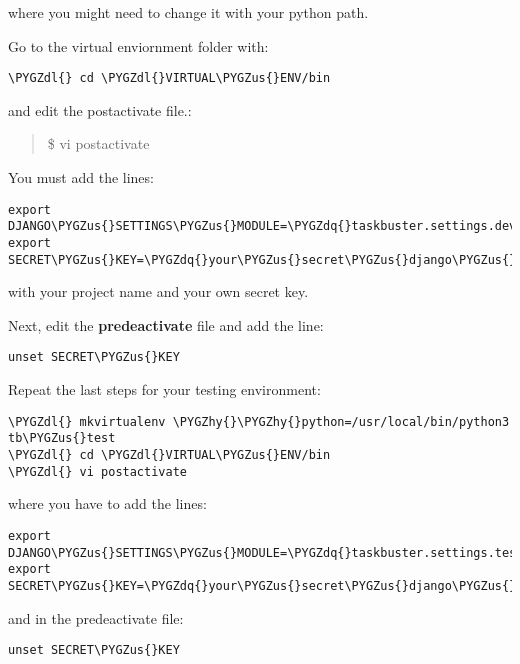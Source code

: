 \documentclass[letterpaper,10pt,english]{sphinxmanual}
\def\PYGZus{\char`\_}
\def\PYGZdl{\char`\$}
\def\PYGZhy{\char`\-}
\def\PYGZdq{\char`\"}
\begin{document}
where you might need to change it with your python path.

Go to the virtual enviornment folder with:

\begin{Verbatim}[commandchars=\\\{\}]
\PYGZdl{} cd \PYGZdl{}VIRTUAL\PYGZus{}ENV/bin
\end{Verbatim}

and edit the postactivate file.:
\begin{quote}

\$ vi postactivate
\end{quote}

You must add the lines:

\begin{Verbatim}[commandchars=\\\{\}]
export DJANGO\PYGZus{}SETTINGS\PYGZus{}MODULE=\PYGZdq{}taskbuster.settings.development\PYGZdq{}
export SECRET\PYGZus{}KEY=\PYGZdq{}your\PYGZus{}secret\PYGZus{}django\PYGZus{}key\PYGZdq{}
\end{Verbatim}

with your project name and your own secret key.

Next, edit the \textbf{predeactivate} file and add the line:

\begin{Verbatim}[commandchars=\\\{\}]
unset SECRET\PYGZus{}KEY
\end{Verbatim}

Repeat the last steps for your testing environment:

\begin{Verbatim}[commandchars=\\\{\}]
\PYGZdl{} mkvirtualenv \PYGZhy{}\PYGZhy{}python=/usr/local/bin/python3 tb\PYGZus{}test
\PYGZdl{} cd \PYGZdl{}VIRTUAL\PYGZus{}ENV/bin
\PYGZdl{} vi postactivate
\end{Verbatim}

where you have to add the lines:

\begin{Verbatim}[commandchars=\\\{\}]
export DJANGO\PYGZus{}SETTINGS\PYGZus{}MODULE=\PYGZdq{}taskbuster.settings.testing\PYGZdq{}
export SECRET\PYGZus{}KEY=\PYGZdq{}your\PYGZus{}secret\PYGZus{}django\PYGZus{}key\PYGZdq{}
\end{Verbatim}

and in the predeactivate file:

\begin{Verbatim}[commandchars=\\\{\}]
unset SECRET\PYGZus{}KEY
\end{Verbatim}
\end{document}
